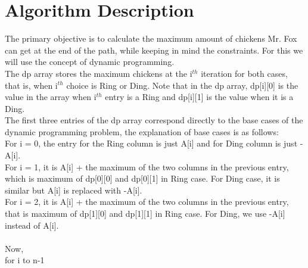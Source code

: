 \documentclass{article}
\begin{document}
\section{Algorithm Description}
The primary objective is to calculate the maximum amount of chickens Mr. Fox can get at the end of the path, while keeping in mind the constraints. For this we will use the concept of dynamic programming.\\
The dp array stores the maximum chickens at the i$^{th}$ iteration for both cases, that is, when i$^{th}$ choice is Ring or Ding. Note that in the dp array, dp[i][0] is the value in the array when i$^{th}$ entry is a Ring and dp[i][1] is the value when it is a Ding. \\
The first three entries of the dp array correspond directly to the base cases of the dynamic programming problem, the explanation of base cases is as follows:\\
For i = 0, the entry for the Ring column is just A[i] and for Ding column is just -A[i].\\
For i = 1, it is A[i] + the maximum of the two columns in the previous entry, which is maximum of dp[0][0] and dp[0][1] in Ring case. For Ding case, it is similar but A[i] is replaced with -A[i].\\
For i = 2, it is A[i] + the maximum of the two columns in the previous entry, that is maximum of dp[1][0] and dp[1][1] in Ring case. For Ding, we use -A[i] instead of A[i].\\
\\
Now,\\
for i to n-1\\
\end{document}
